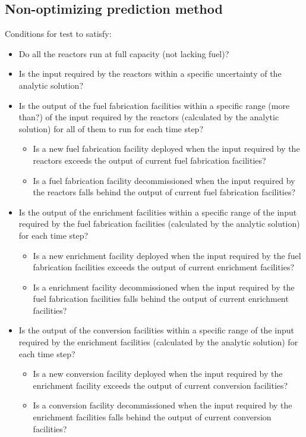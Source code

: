 \documentclass[12pt,letterpaper]{article}
\begin{document}
\subsection*{Non-optimizing prediction method}
Conditions for test to satisfy: 
\begin{itemize}
\item  Do all the reactors run at full capacity (not lacking fuel)? 
\item Is the input required by the reactors within a specific uncertainty of the analytic solution? 
\item  Is the output of the fuel fabrication facilities within a specific range (more than?) of the input required by the reactors (calculated by the analytic solution) for all of them to run for each time step? 
\begin{itemize}
\item Is a new fuel fabrication facility deployed when the input required by the reactors exceeds the output of current fuel fabrication facilities?
\item Is a fuel fabrication facility decommissioned when the input required by the reactors falls behind the output of current fuel fabrication facilities?
\end{itemize}
\item  Is the output of the enrichment facilities within a specific range of the input required by the fuel fabrication facilities (calculated by the analytic solution) for each time step? 
\begin{itemize}
\item Is a new enrichment facility deployed when the input required by the fuel fabrication facilities exceeds the output of current enrichment facilities?
\item Is a enrichment facility decommissioned when the input required by the fuel fabrication facilities falls behind the output of current enrichment facilities?
\end{itemize}
\item Is the output of the conversion facilities within a specific range of the input required by the enrichment facilities (calculated by the analytic solution) for each time step? 
\begin{itemize}
\item Is a new conversion facility deployed when the input required by the enrichment facility exceeds the output of current conversion facilities?
\item Is a conversion facility decommissioned when the input required by the enrichment facilities falls behind the output of current conversion facilities?

\end{itemize}
\end{itemize}
\end{document}
